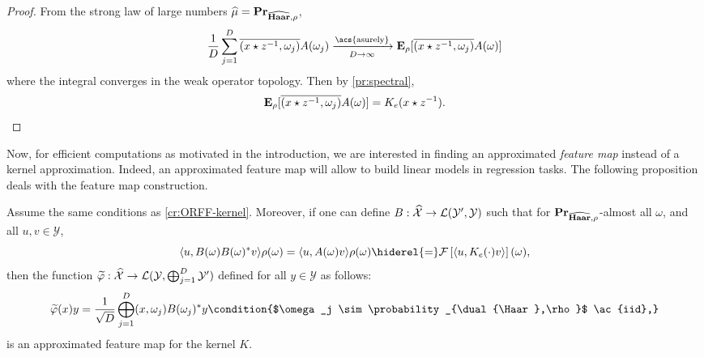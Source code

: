 \begin{proof}
    From the strong law of large numbers
    $\widehat{\mu}={\mathbf{{Pr}}}_{\widehat{\mathbf{Haar}},\rho}$,
    \begin{dmath*}
        \frac{1}{D} \sum_{j=1}^D \conj{\pairing{x\groupop\inv{z},\omega_j}}
        A(\omega_j) \converges{\acs{asurely}}{D \to \infty}
        \expectation_{\rho}[\conj{\pairing{x \groupop z^{-1}, \omega_j}
        }A(\omega)] 
    \end{dmath*}
    where the integral converges in the weak operator topology. Then by 
    \cref{pr:spectral}, 
    \begin{dmath*}
        \expectation_{\rho}[\conj{\pairing{x \groupop z^{-1},
        \omega_j}}A(\omega)] =K_e(x\groupop\inv{z}).
    \end{dmath*}
\end{proof}
Now, for efficient computations as motivated in the introduction, we are
interested in finding an approximated \emph{feature map} instead of a kernel
approximation. Indeed, an approximated feature map will allow to build linear
models in regression tasks. The following proposition deals with the feature
map construction.
\begin{proposition}
    \label{cr:ORFF-map-kernel} Assume the same conditions as
    \cref{cr:ORFF-kernel}. Moreover, if one can define $B: \widehat{\mathcal{X}}
    \to \mathcal{L}(\mathcal{Y}',\mathcal{Y})$ such that for
    ${\mathbf{{Pr}}}_{\widehat{\mathbf{Haar}},\rho}$-almost all $\omega$, and all $u,
    v\in\mathcal{Y}$,
    \begin{dmath*}
        \inner{u, B(\omega)B(\omega)^\adjoint v}\rho(\omega)= \inner{u,
        A(\omega)v}\rho(\omega) \hiderel{=} \FT{\inner{u, K_e(\cdot)v}}(\omega),
    \end{dmath*}
    then the function $\tildePhi{\omega}:\dual{\mathcal{X}} \to
    \mathcal{L}(\mathcal{Y}, \Vect_{j=1}^D \mathcal{Y'})$ defined for all $y
    \in \mathcal{Y}$ as
    follows: \begin{dmath*}
        \tildePhi{\omega}(x)y
        = \frac{1}{\sqrt{D}}\Vect_{j=1}^D\pairing{x,
        \omega_j}B(\omega_j)^\adjoint y \condition{$\omega_j \sim
        \probability_{\dual{\Haar},\rho}$ \ac{iid},}
    \end{dmath*}
    is an approximated feature map for
    the kernel $K$.
\end{proposition}
